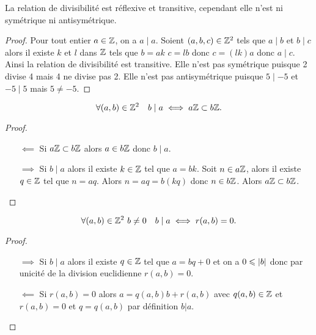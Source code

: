\begin{prop}
  La relation de divisibilité est réflexive et transitive, cependant elle n'est
  ni symétrique ni antisymétrique.
\end{prop}
\begin{proof}
  Pour tout entier \(a \in \mathbb{Z}\), on a \(a\mid a\). Soient \((a,b,c) \in \mathbb{Z}^2\)
  tels que \(a\mid b\) et \(b\mid c\) alors il existe \(k\) et \(l\) dans \(\mathbb{Z}\)
  tels que \(b=ak\) \(c=lb\) donc \(c=(lk)a\) donc \(a\mid c\). Ainsi la
  relation de divisibilité est transitive. Elle n'est pas symétrique puisque 2
  divise 4 mais 4 ne divise pas 2. Elle n'est pas antisymétrique puisque \(5\mid
  -5\) et \(-5 \mid 5\) mais \(5 \neq -5\).
\end{proof}
\begin{prop}
  \begin{equation}
    \forall (a,b) \in \mathbb{Z}^2 \quad b\mid a \iff a\mathbb{Z} \subset b\mathbb{Z}.
  \end{equation}
\end{prop}
\begin{proof}
  \begin{itemize}
    \item[\(\impliedby\)] Si \(a\mathbb{Z} \subset b\mathbb{Z}\) alors \(a \in b\mathbb{Z}\) donc
      \(b\mid a\).
    \item[\(\implies\)] Si \(b\mid a\) alors il existe \(k \in \mathbb{Z}\) tel que
      \(a=bk\). Soit \(n \in a\mathbb{Z}\), alors il existe \(q \in \mathbb{Z}\) tel que
      \(n=aq\). Alors \(n=aq=b(kq)\) donc \(n \in b\mathbb{Z}\). Alors \(a\mathbb{Z} \subset
      b\mathbb{Z}\).
  \end{itemize}
\end{proof}
\begin{prop}
  \begin{equation}
    \forall (a,b) \in \mathbb{Z}^2 \ b\neq 0 \quad b\mid a \iff r(a,b)=0.
  \end{equation}
\end{prop}
\begin{proof}
  \begin{itemize}
    \item[\(\implies\)] Si \(b\mid a\) alors il existe \(q \in \mathbb{Z}\) tel que
      \(a=bq+0\) et on a \(0\leqslant \left\lvert b\right\rvert\) donc par unicité de la division
      euclidienne \(r(a,b)=0\).
    \item[\(\impliedby\)] Si \(r(a,b)=0\) alors \(a=q(a,b) b+r(a,b)\) avec
      \(q(a,b) \in \mathbb{Z}\) et \(r(a,b)=0\) et \(q=q(a,b)\) par définition \(b|a\).
  \end{itemize}
\end{proof}

